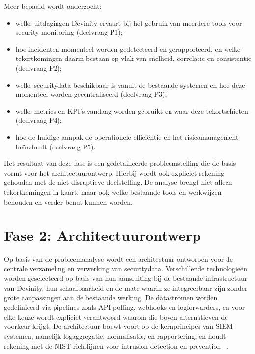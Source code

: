 Meer bepaald wordt onderzocht:

\begin{itemize}
    \item welke uitdagingen Devinity ervaart bij het gebruik van meerdere tools voor security monitoring (deelvraag P1);
    
    \item hoe incidenten momenteel worden gedetecteerd en gerapporteerd, en welke tekortkomingen daarin bestaan op vlak van snelheid, correlatie en consistentie (deelvraag P2);
    
    \item welke securitydata beschikbaar is vanuit de bestaande systemen en hoe deze momenteel worden gecentraliseerd (deelvraag P3);
    
    \item welke metrics en KPI's vandaag worden gebruikt en waar deze tekortschieten (deelvraag P4);
    
    \item hoe de huidige aanpak de operationele efficiëntie en het risicomanagement beïnvloedt (deelvraag P5).
\end{itemize}

Het resultaat van deze fase is een gedetailleerde probleemstelling die de basis vormt voor het architectuurontwerp. Hierbij wordt ook expliciet rekening gehouden met de niet-disruptieve doelstelling. De analyse brengt niet alleen tekortkomingen in kaart, maar ook welke bestaande tools en werkwijzen behouden en verder benut kunnen worden.

\section{Fase 2: Architectuurontwerp}
Op basis van de probleemanalyse wordt een architectuur ontworpen voor de centrale verzameling en verwerking van securitydata. Verschillende technologieën worden geselecteerd op basis van hun aansluiting bij de bestaande infrastructuur van Devinity, hun schaalbaarheid en de mate waarin ze integreerbaar zijn zonder grote aanpassingen aan de bestaande werking. De datastromen worden gedefinieerd via pipelines zoals API-polling, webhooks en logforwarders, en voor elke keuze wordt expliciet verantwoord waarom die boven alternatieven de voorkeur krijgt. De architectuur bouwt voort op de kernprincipes van SIEM-systemen, namelijk logaggregatie, normalisatie, en rapportering, en houdt rekening met de NIST-richtlijnen voor intrusion detection en prevention ~\autocite{Scarfone_Mell_2007}.

